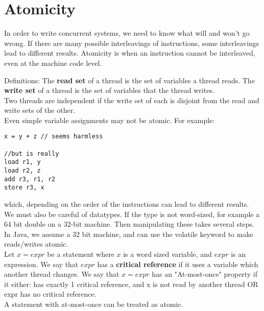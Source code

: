 \documentclass[12pt]{article}
\theoremstyle{definition}
\begin{document}
\section{Atomicity}
In order to write concurrent systems, we need to know what will and won't go wrong. If there are many possible interleavings of instructions, some interleavings lead to different results. Atomicity is when an instruction cannot be interleaved, even at the machine code level. 
\\ \linebreak

Definitions: The \textbf{read set} of a thread is the set of variables a thread reads. The \textbf{write set} of a thread is the set of variables that the thread writes.
\\ \linebreak
Two threads are independent if the write set of each is disjoint from the read and write sets of the other. 
\\ \linebreak
Even simple variable assignments may not be atomic. For example: 
\begin{lstlisting}
x = y + z // seems harmless

//but is really
load r1, y
load r2, z
add r3, r1, r2
store r3, x
\end{lstlisting}

which, depending on the order of the instructions can lead to different results. 
\\ \linebreak
We must also be careful of datatypes. If the type is not word-sized, for example a 64 bit double on a 32-bit machine. Then manipulating these takes several steps. 
\\ \linebreak
In Java, we assume a 32 bit machine, and can use the volatile keyword to make reads/writes atomic.
\\ \linebreak
Let $x=expr$ be a statement where $x$ is a word sized variable, and $expr$ is an expression. We say that $expr$ has a \textbf{critical reference} if it uses a variable which another thread changes. We say that $x=expr$ has an "At-most-once" property if it either: has exactly 1 critical reference, and x is not read by another thread OR expr has no critical reference.
\\ \linebreak
A statement with at-most-once can be treated as atomic.
\\ \linebreak
\end{document}

